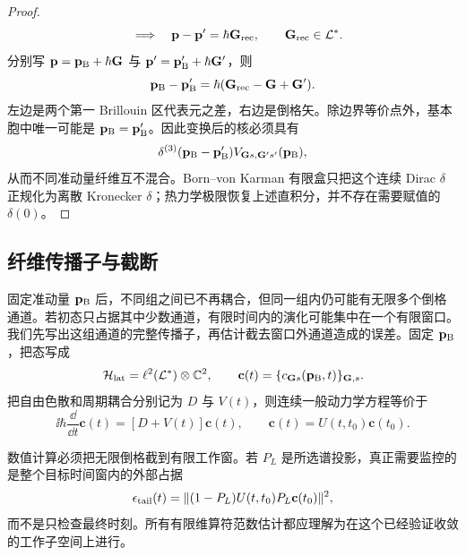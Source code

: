 \begin{proof}
\begin{equation*}
\quad\Longrightarrow\quad
\mathbf p-\mathbf p'=\hbar\mathbf G_{\rm rec},
\qquad \mathbf G_{\rm rec}\in\mathcal L^*.
\end{equation*}
分别写
$\mathbf p=\mathbf p_{\rm B}+\hbar\mathbf G$ 与
$\mathbf p'=\mathbf p_{\rm B}'+\hbar\mathbf G'$，则
\begin{equation*}
\mathbf p_{\rm B}-\mathbf p_{\rm B}'
=\hbar(\mathbf G_{\rm rec}-\mathbf G+\mathbf G').
\end{equation*}
左边是两个第一 Brillouin 区代表元之差，右边是倒格矢。除边界等价点外，基本胞中唯一可能是
$\mathbf p_{\rm B}=\mathbf p_{\rm B}'$。因此变换后的核必须具有
\begin{equation*}
\delta^{(3)}(\mathbf p_{\rm B}-\mathbf p_{\rm B}')
V_{\mathbf Gs,\mathbf G's'}(\mathbf p_{\rm B}),
\end{equation*}
从而不同准动量纤维互不混合。Born--von Karman 有限盒只把这个连续 Dirac $\delta$ 正规化为离散 Kronecker $\delta$；热力学极限恢复上述直积分，并不存在需要赋值的 $\delta(0)$。
\end{proof}


\subsection{纤维传播子与截断}

固定准动量 $\mathbf p_{\rm B}$ 后，不同组之间已不再耦合，但同一组内仍可能有无限多个倒格通道。若初态只占据其中少数通道，有限时间内的演化可能集中在一个有限窗口。我们先写出这组通道的完整传播子，再估计截去窗口外通道造成的误差。固定 $\mathbf p_{\rm B}$，把态写成
\begin{equation*}
\mathcal H_{\rm lat}=\ell^2(\mathcal L^*)\otimes\mathbb C^2,
\qquad
\mathbf c(t)=\{c_{\mathbf Gs}(\mathbf p_{\rm B},t)\}_{\mathbf G,s}.
\end{equation*}
把自由色散和周期耦合分别记为 $D$ 与 $V(t)$，则连续一般动力学方程等价于
\begin{equation}
\boxed{
\ii\hbar\frac{\dd}{\dd t}\mathbf c(t)
=[D+V(t)]\mathbf c(t),
\qquad
\mathbf c(t)=U(t,t_0)\mathbf c(t_0).}
\label{eq:periodic_lattice_exact_operator_evolution}
\end{equation}

数值计算必须把无限倒格截到有限工作窗。若 $P_L$ 是所选谱投影，真正需要监控的是整个目标时间窗内的外部占据
\begin{equation*}
\epsilon_{\rm tail}(t)
=\|(1-P_L)U(t,t_0)P_L\mathbf c(t_0)\|^2,
\end{equation*}
而不是只检查最终时刻。所有有限维算符范数估计都应理解为在这个已经验证收敛的工作子空间上进行。


